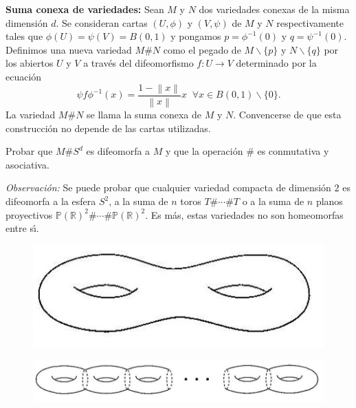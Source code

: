 \documentclass[12pt, a4paper]{amsart}
\theoremstyle{definition}
\newcommand{\RR}{\mathbb{R}}      %
\newcommand{\norm}[1]{\left\| #1 \right\|}
\begin{document}
\begin{question}
\textbf{Suma conexa de variedades:} Sean $M$ y $N$ dos variedades conexas de la misma dimensión $d$. Se consideran cartas $(U,\phi)$ y $(V,\psi)$ de $M$ y $N$ respectivamente tales que $\phi(U)=\psi(V)=B(0,1)$ y pongamos $p=\phi^{-1}(0)$ y $q=\psi^{-1}(0)$. Definimos una nueva variedad $M\# N$ como el pegado de $M\smallsetminus\{p\}$ y $N\smallsetminus\{q\}$ por los abiertos $U$ y $V$ a través del difeomorfismo $f:U\to V$ determinado por la ecuación $$\psi f\phi^{-1}(x)=\dfrac{1-\norm{x}}{\norm{x}} x \;\;\forall x\in B(0,1)\smallsetminus\{0\}.$$ La variedad $M\# N$ se llama la suma conexa de $M$ y $N$. Convencerse de que esta construcción no depende de las cartas utilizadas.

\noindent Probar que $M\# S^d$ es difeomorfa a $M$ y que la operación $\#$ es conmutativa y asociativa.
\vspace{1em}

\noindent \textit{Observación:} Se puede probar que cualquier variedad compacta de dimensi\'on $2$ es difeomorfa a la esfera $S^2$, a la suma de $n$ toros $T\#\cdots\# T$ o a la suma de $n$ planos proyectivos $\mathbb{P}(\RR)^2\#\cdots\#\mathbb{P}(\RR)^2$. Es m\'as, estas variedades no son homeomorfas entre s\'{\i}.

\begin{figure}[H]
	\centering
		\includegraphics[scale=0.5]{Practica1toro2.jpg}
	\label{fig:Practica1toro2}
\end{figure}

\begin{figure}[H]
	\centering
		\includegraphics[scale=0.5]{Practica1torog.jpg}
	\label{fig:Practica1torog}
\end{figure}


\end{question}
\end{document}
